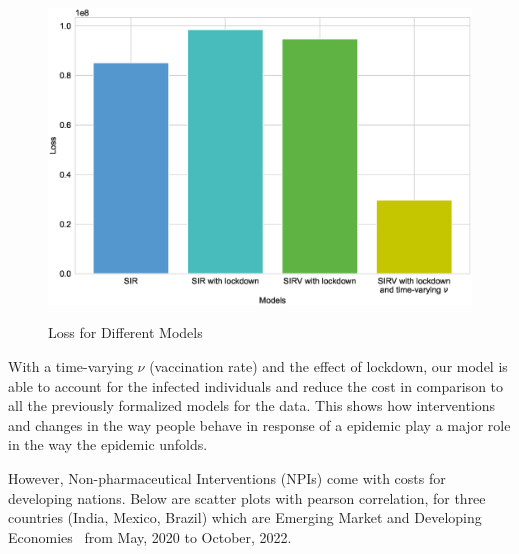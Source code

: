 \documentclass[tikz,fleqn,12pt]{wlscirep}
\begin{document}
\begin{figure}[H]
  \centering
  \caption{Loss for Different Models}
  \includegraphics[width=\linewidth]{images/comparing_costs_IND.eps}
  \label{fig:comparing_costs_IND}
\end{figure}

With a time-varying $\nu$ (vaccination rate) and the effect of lockdown, our model is able to account for the infected individuals and reduce the cost in comparison to all the previously formalized models for the data. This shows how interventions and changes in the way people behave in response of a epidemic \cite{Caldwell2021} play a major role in the way the epidemic unfolds.

However, Non-pharmaceutical Interventions (NPIs) come with costs for developing nations. Below are scatter plots with pearson correlation, for three countries (India, Mexico, Brazil) which are Emerging Market and Developing Economies~\cite{IMFCovid} from May, 2020 to October, 2022.
\end{document}
